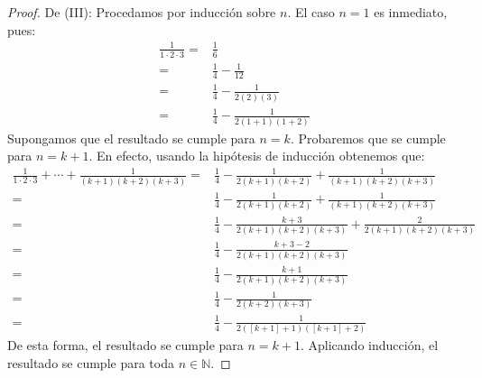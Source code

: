 \documentclass[12pt]{article}
\begin{document}
\begin{enumerate}
\begin{proof}
        De (III): Procedamos por inducción sobre $n$. El caso $n=1$ es inmediato, pues:
        \begin{equation*}
            \begin{split}
                \frac{1}{1\cdot2\cdot3}=&\frac{1}{6}\\
                =&\frac{1}{4}-\frac{1}{12}\\
                =&\frac{1}{4}-\frac{1}{2(2)(3)}\\
                =&\frac{1}{4}-\frac{1}{2(1+1)(1+2)}
            \end{split}
        \end{equation*}
        Supongamos que el resultado se cumple para $n=k$. Probaremos que se cumple para $n=k+1$. En efecto, usando la hipótesis de inducción obtenemos que:
        \begin{equation*}
            \begin{split}
                \frac{1}{1\cdot2\cdot3}+\cdots+\frac{1}{(k+1)(k+2)(k+3)} = &\frac{1}{4}-\frac{1}{2\left(k+1\right)\left(k+2\right)}+\frac{1}{(k+1)\left(k+2\right)\left(k+3\right)}\\
                =&\frac{1}{4}-\frac{1}{2\left(k+1\right)\left(k+2\right)}+\frac{1}{(k+1)\left(k+2\right)\left(k+3\right)}\\
                =&\frac{1}{4}-\frac{k+3}{2\left(k+1\right)\left(k+2\right)(k+3)}+\frac{2}{2(k+1)\left(k+2\right)\left(k+3\right)}\\
                =&\frac{1}{4}-\frac{k+3-2}{2\left(k+1\right)\left(k+2\right)(k+3)}\\
                =&\frac{1}{4}-\frac{k+1}{2\left(k+1\right)\left(k+2\right)(k+3)}\\
                =&\frac{1}{4}-\frac{1}{2\left(k+2\right)(k+3)}\\
                =&\frac{1}{4}-\frac{1}{2\left([k+1]+1\right)([k+1]+2)}
            \end{split}
        \end{equation*}
        De esta forma, el resultado se cumple para $n=k+1$. Aplicando inducción, el resultado se cumple para toda $n\in\mathbb{N}$.
        

\end{proof}
\end{enumerate}
\end{document}
